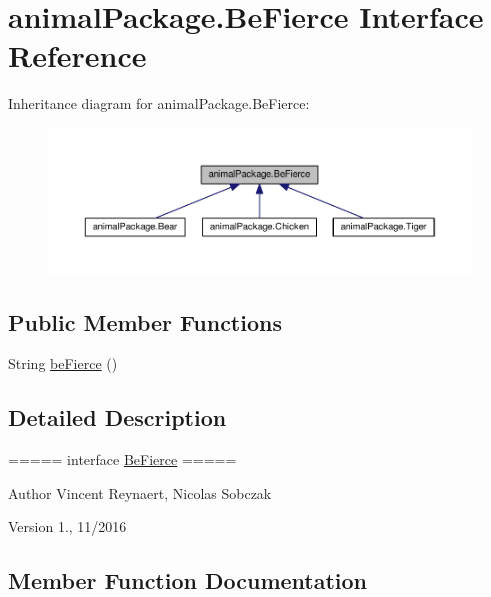 \hypertarget{interfaceanimal_package_1_1_be_fierce}{}\section{animal\+Package.\+Be\+Fierce Interface Reference}
\label{interfaceanimal_package_1_1_be_fierce}


Inheritance diagram for animal\+Package.\+Be\+Fierce\+:\nopagebreak
\begin{figure}[H]
\begin{center}
\leavevmode
\includegraphics[width=350pt]{interfaceanimal_package_1_1_be_fierce__inherit__graph}
\end{center}
\end{figure}
\subsection*{Public Member Functions}
\begin{DoxyCompactItemize}
\item 
String \hyperlink{interfaceanimal_package_1_1_be_fierce_aaa3925a8d59cbeccc2cb2a6d46d4ba2e}{be\+Fierce} ()
\end{DoxyCompactItemize}


\subsection{Detailed Description}
===== interface \hyperlink{interfaceanimal_package_1_1_be_fierce}{Be\+Fierce} =====

\begin{DoxyAuthor}{Author}
Vincent Reynaert, Nicolas Sobczak 
\end{DoxyAuthor}
\begin{DoxyVersion}{Version}
1., 11/2016 
\end{DoxyVersion}


\subsection{Member Function Documentation}
